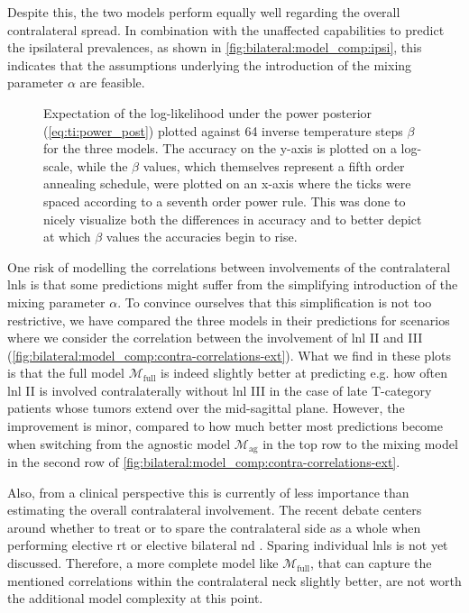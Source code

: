\documentclass[\relativeRoot/main.tex]{subfiles}
\begin{document}
Despite this, the two models perform equally well regarding the overall contralateral spread. In combination with the unaffected capabilities to predict the ipsilateral prevalences, as shown in \cref{fig:bilateral:model_comp:ipsi}, this indicates that the assumptions underlying the introduction of the mixing parameter $\alpha$ are feasible.

\begin{figure}
    \centering
    
    \caption[Plotted accuracy over the course of a thermodynamic integration round]{
        Expectation of the log-likelihood under the power posterior (\cref{eq:ti:power_post}) plotted against 64 inverse temperature steps $\beta$ for the three models. The accuracy on the y-axis is plotted on a log-scale, while the $\beta$ values, which themselves represent a fifth order annealing schedule, were plotted on an x-axis where the ticks were spaced according to a seventh order power rule. This was done to nicely visualize both the differences in accuracy and to better depict at which $\beta$ values the accuracies begin to rise.
    }
    \label{fig:bilateral:model_comp:thermo_int}
\end{figure}

One risk of modelling the correlations between involvements of the contralateral \glspl{lnl} is that some predictions might suffer from the simplifying introduction of the mixing parameter $\alpha$. To convince ourselves that this simplification is not too restrictive, we have compared the three models in their predictions for scenarios where we consider the correlation between the involvement of \gls{lnl} II and III (\cref{fig:bilateral:model_comp:contra-correlations-ext}). What we find in these plots is that the full model $\mathcal{M}_\text{full}$ is indeed slightly better at predicting e.g. how often \gls{lnl} II is involved contralaterally without \gls{lnl} III in the case of late T-category patients whose tumors extend over the mid-sagittal plane. However, the improvement is minor, compared to how much better most predictions become when switching from the agnostic model $\mathcal{M}_\text{ag}$ in the top row to the mixing model in the second row of \cref{fig:bilateral:model_comp:contra-correlations-ext}.

Also, from a clinical perspective this is currently of less importance than estimating the overall contralateral involvement. The recent debate centers around whether to treat or to spare the contralateral side as a whole when performing elective \gls{rt} or elective bilateral \gls{nd} \cite{biau_selection_2019,al-mamgani_contralateral_2017}. Sparing individual \glspl{lnl} is not yet discussed. Therefore, a more complete model like $\mathcal{M}_\text{full}$, that can capture the mentioned correlations within the contralateral neck slightly better, are not worth the additional model complexity at this point.
\end{document}
